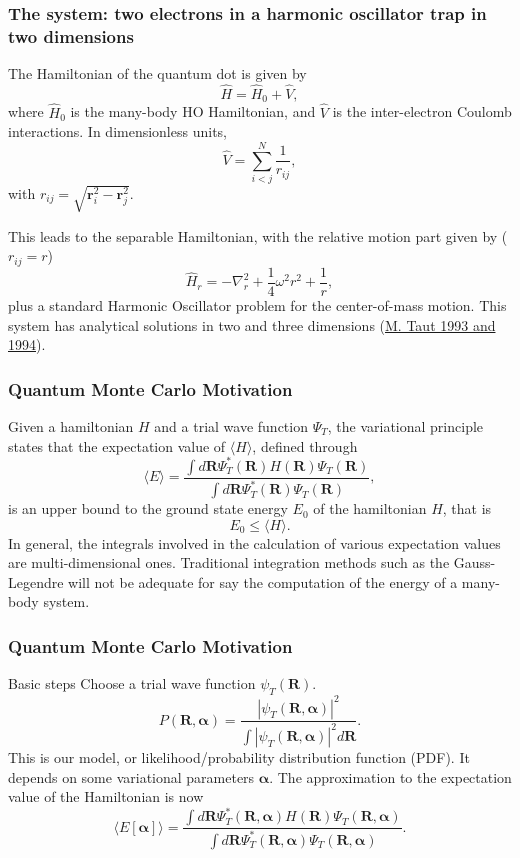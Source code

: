 \documentclass{beamer}
\begin{document}
\begin{frame}
\frametitle{The system: two electrons in a harmonic oscillator trap in two dimensions}

The Hamiltonian of the quantum dot is given by
\[ \hat{H} = \hat{H}_0 + \hat{V}, 
\]
where $\hat{H}_0$ is the many-body HO Hamiltonian, and $\hat{V}$ is the
inter-electron Coulomb interactions. In dimensionless units,
\[ \hat{V}= \sum_{i<j}^N \frac{1}{r_{ij}},
\]
with $r_{ij}=\sqrt{\mathbf{r}_i^2 - \mathbf{r}_j^2}$.

This leads to the  separable Hamiltonian, with the relative motion part given by ($r_{ij}=r$)
\[ 
\hat{H}_r=-\nabla^2_r + \frac{1}{4}\omega^2r^2+ \frac{1}{r},
\]
plus a standard Harmonic Oscillator problem  for the center-of-mass motion.
This system has analytical solutions in two and three dimensions (\href{{https://journals.aps.org/pra/abstract/10.1103/PhysRevA.48.3561}}{M. Taut 1993 and 1994}).
\end{frame}

\begin{frame}
\frametitle{Quantum Monte Carlo Motivation}

\begin{block}{}
Given a hamiltonian $H$ and a trial wave function $\Psi_T$, the variational principle states that the expectation value of $\langle H \rangle$, defined through 
\[
   \langle E \rangle =
   \frac{\int d\bm{R}\Psi^{\ast}_T(\bm{R})H(\bm{R})\Psi_T(\bm{R})}
        {\int d\bm{R}\Psi^{\ast}_T(\bm{R})\Psi_T(\bm{R})},
\]
is an upper bound to the ground state energy $E_0$ of the hamiltonian $H$, that is 
\[
    E_0 \le \langle H \rangle .
\]
In general, the integrals involved in the calculation of various  expectation values  are multi-dimensional ones. Traditional integration methods such as the Gauss-Legendre will not be adequate for say the  computation of the energy of a many-body system.
\end{block}
\end{frame}

\begin{frame}
\frametitle{Quantum Monte Carlo Motivation}

\begin{block}{Basic steps }
Choose a trial wave function
$\psi_T(\bm{R})$.
\[
   P(\bm{R},\bm{\alpha})= \frac{\left|\psi_T(\bm{R},\bm{\alpha})\right|^2}{\int \left|\psi_T(\bm{R},\bm{\alpha})\right|^2d\bm{R}}.
\]
This is our model, or likelihood/probability distribution function  (PDF). It depends on some variational parameters $\bm{\alpha}$.
The approximation to the expectation value of the Hamiltonian is now 
\[
   \langle E[\bm{\alpha}] \rangle = 
   \frac{\int d\bm{R}\Psi^{\ast}_T(\bm{R},\bm{\alpha})H(\bm{R})\Psi_T(\bm{R},\bm{\alpha})}
        {\int d\bm{R}\Psi^{\ast}_T(\bm{R},\bm{\alpha})\Psi_T(\bm{R},\bm{\alpha})}.
\]
\end{block}
\end{frame}
\end{document}
